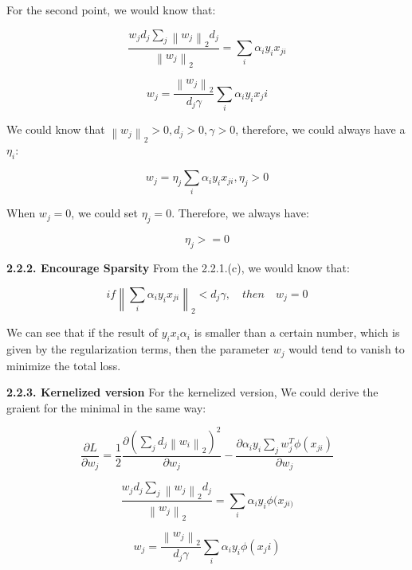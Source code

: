 \documentclass{article} %
\newcommand{\norm}[1]{\left\lVert #1 \right\rVert}
\begin{document}
For the second point, we would know that:

\begin{equation}
\frac{w_j d_j \sum_j \norm{w_j}_2 d_j }{\norm{w_j}_2} = \sum_i \alpha_i y_i x_{ji}
\end{equation}

\begin{equation}
w_j = \frac{\norm{w_j}_2}{d_j \gamma} \sum_i \alpha_i y_i x_ji
\end{equation}

We could know that $\norm{w_j}_2 > 0, d_j>0, \gamma>0$, therefore, we could
always have a $\eta_i$:

\begin{equation}
w_j = \eta_j \sum_i \alpha_i y_i x_{ji}, \eta_j > 0
\end{equation}

When $w_j = 0$, we could set $\eta_j = 0$. Therefore, we always have:

\begin{equation}
\eta_j >= 0
\end{equation}

\textbf{2.2.2. Encourage Sparsity}
From the 2.2.1.(c), we would know that:

\begin{equation}
if \norm{\sum_i \alpha_i y_i x_{ji}}_2 < d_j \gamma, \quad then \quad w_j = 0
\end{equation}

We can see that if the result of $y_i x_i \alpha_i$ is smaller than a certain
number, which is given by the regularization terms, then the parameter $w_j$
would tend to vanish to minimize the total loss.

\textbf{2.2.3. Kernelized version}
For the kernelized version, We could derive the graient for the minimal in the
same way:

\begin{equation}
\frac{\partial L}{\partial w_j} = \frac{1}{2} \frac{\partial (\sum_j d_j
\norm{w_i}_2)^2}{\partial w_j} - \frac{\partial \alpha_i y_i \sum_j w_j^T
\phi (x_{ji})}{\partial w_j}
\end{equation}

\begin{equation}
\frac{w_j d_j \sum_j \norm{w_j}_2 d_j }{\norm{w_j}_2} = \sum_i \alpha_i y_i \phi
(x_{ji)}
\end{equation}

\begin{equation}
w_j = \frac{\norm{w_j}_2}{d_j \gamma} \sum_i \alpha_i y_i \phi (x_ji)
\end{equation}
\end{document}
